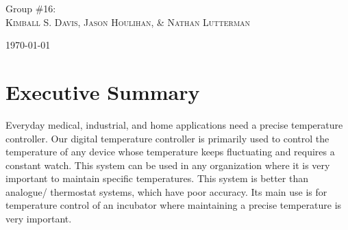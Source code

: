 \documentclass[11pt]{article}
\begin{document}
\begin{titlepage}
	
	\Large{Group \#16:}\\
		 \Large\textsc{Kimball S. Davis, Jason Houlihan, \& Nathan Lutterman} %
	
	
	\vfill\vfill\vfill\vfill %
	
	{\large\today} %
	
	
	 
	
	\vfill %
	
\end{titlepage}

\setlength{\columnsep}{.2 in}

\setlength{\parskip}{0pt}

	
\section*{Executive Summary}
Everyday medical, industrial, and home applications need a precise temperature controller. Our digital temperature controller is primarily used to control the temperature of any device whose temperature keeps fluctuating and requires a constant watch. This system can be used in any organization where it is very important to maintain specific temperatures. This system is better than analogue/ thermostat systems, which have poor accuracy. Its main use is for temperature control of an incubator where maintaining a precise temperature is very important.\\
\end{document}
